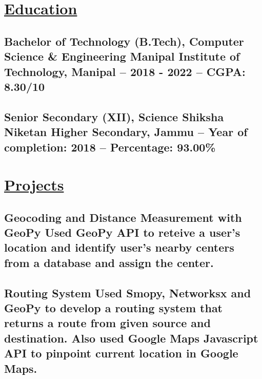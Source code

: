 \documentclass{article}
\begin{document}
\section{\underline{Education}}

\subsection{\textbf{Bachelor of Technology (B.Tech), Computer Science \& Engineering}\newline
    \textmd{Manipal Institute of Technology, Manipal --  2018 - 2022 -- CGPA: 8.30/10}}

\subsection{\textbf{Senior Secondary (XII), Science}\newline
    \textmd{ Shiksha Niketan Higher Secondary, Jammu -- Year of completion: 2018 --  Percentage: 93.00\%}}


\section{\underline{Projects}}





\subsection{\textbf{Geocoding and Distance Measurement with GeoPy}
    \newline
    \textmd{Used GeoPy API to reteive a user's location and identify user's nearby centers from a database and assign the center.}}

\subsection{\textbf{Routing System}
    \textmd{Used Smopy, Networksx and GeoPy to develop a routing system that returns a route from given source and destination. Also used Google Maps Javascript API to pinpoint current location in Google Maps. }}
\end{document}
